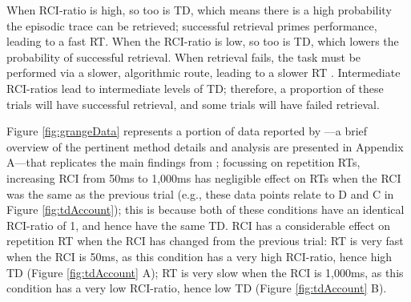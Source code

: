 \documentclass[a4paper, jou, natbib]{apa6}
\begin{document}
When RCI-ratio is high, so too is TD, which means there is a high probability the episodic trace can be retrieved; successful retrieval primes performance, leading to a fast RT. When the RCI-ratio is low, so too is TD, which lowers the probability of successful retrieval. When retrieval fails, the task must be performed via a slower, algorithmic route, leading to a slower RT \citep[see][for a similar proposal]{Logan2001}. Intermediate RCI-ratios lead to intermediate levels of TD; therefore, a proportion of these trials will have successful retrieval, and some trials will have failed retrieval. 

Figure \ref{fig:grangeData} represents a portion of data reported by \cite{Grangeinrevision}---a brief overview of the pertinent method details and analysis are presented in Appendix A---that replicates the main findings from \cite{Horoufchin2011a}; focussing on repetition RTs, increasing RCI from 50ms to 1,000ms has negligible effect on RTs when the RCI was the same as the previous trial (e.g., these data points relate to D and C in Figure \ref{fig:tdAccount}); this is because both of these conditions have an identical RCI-ratio of 1, and hence have the same TD. RCI has a considerable effect on repetition RT when the RCI has changed from the previous trial: RT is very fast when the RCI is 50ms, as this condition has a very high RCI-ratio, hence high TD (Figure \ref{fig:tdAccount} A); RT is very slow when the RCI is 1,000ms, as this condition has a very low RCI-ratio, hence low TD (Figure \ref{fig:tdAccount} B). 
\end{document}
